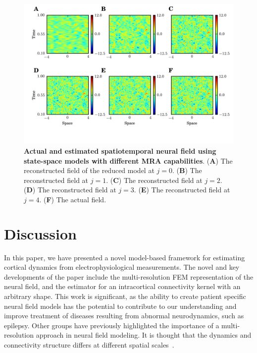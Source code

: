 \documentclass[review,authoryear,3p]{elsarticle}
\newcommand{\dean}[1]{\textcolor{green}{#1}}
\begin{document}
\begin{figure}[t]
	\centering
		\includegraphics[scale=1]{./Graph/fig12.png}
	\caption{{\bf Actual and estimated spatiotemporal neural field using state-space models with different MRA capabilities}. (\textbf{A}) The reconstructed field of the reduced model at $j=0$. (\textbf{B}) The reconstructed field at $j=1$. (\textbf{C}) The reconstructed field at $j=2$. (\textbf{D}) The reconstructed field at $j=3$. (\textbf{E}) The reconstructed field at $j=4$. (\textbf{F}) The actual field.} 
\label{fig:FieldEstimation}
\end{figure}
\section{Discussion}
In this paper, we have presented a novel model-based framework for estimating cortical dynamics from electrophysiological measurements. The novel and key developments of the paper include the multi-resolution FEM representation of the neural field, and the estimator for an intracortical connectivity kernel with an arbitrary shape. This work is significant, as the ability to create patient specific neural field models has the potential to contribute to our understanding and improve treatment of diseases resulting from abnormal neurodynamics, such as epilepsy. Other groups have previously highlighted the importance of a multi-resolution approach in neural field modeling. It is thought that the dynamics and connectivity structure differs at different spatial scales~\citep{Qubbaj2009,Breakspear2005}. %
\end{document}
